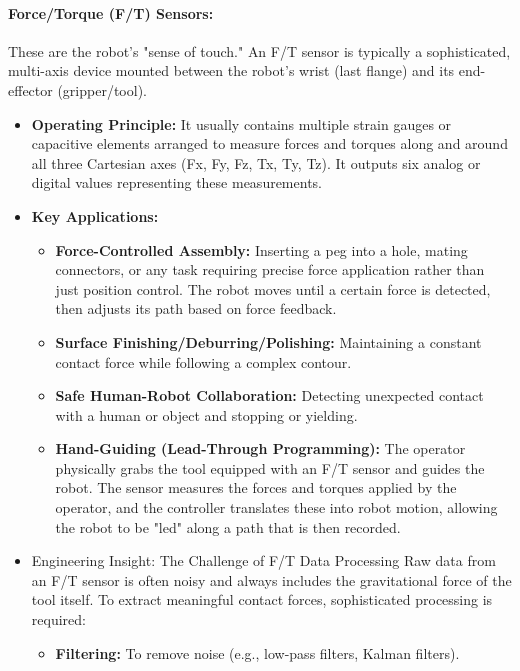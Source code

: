 \paragraph{\textbf{Force/Torque (F/T) Sensors:}}
    These are the robot's "sense of touch." An F/T sensor is typically a sophisticated, multi-axis device mounted between the robot's wrist (last flange) and its end-effector (gripper/tool).
    \begin{itemize}
        \item \textbf{Operating Principle:} It usually contains multiple strain gauges or capacitive elements arranged to measure forces and torques along and around all three Cartesian axes (Fx, Fy, Fz, Tx, Ty, Tz). It outputs six analog or digital values representing these measurements.
        \item \textbf{Key Applications:}
            \begin{itemize}
                \item \textbf{Force-Controlled Assembly:} Inserting a peg into a hole, mating connectors, or any task requiring precise force application rather than just position control. The robot moves until a certain force is detected, then adjusts its path based on force feedback.
                \item \textbf{Surface Finishing/Deburring/Polishing:} Maintaining a constant contact force while following a complex contour.
                \item \textbf{Safe Human-Robot Collaboration:} Detecting unexpected contact with a human or object and stopping or yielding.
                \item \textbf{Hand-Guiding (Lead-Through Programming):} The operator physically grabs the tool equipped with an F/T sensor and guides the robot. The sensor measures the forces and torques applied by the operator, and the controller translates these into robot motion, allowing the robot to be "led" along a path that is then recorded.
            \end{itemize}
        \item \begin{tipbox}{Engineering Insight: The Challenge of F/T Data Processing} %
            Raw data from an F/T sensor is often noisy and always includes the gravitational force of the tool itself. To extract meaningful contact forces, sophisticated processing is required:
            \begin{itemize}
                \item \textbf{Filtering:} To remove noise (e.g., low-pass filters, Kalman filters).

\end{itemize}
\end{tipbox}
\end{itemize}
